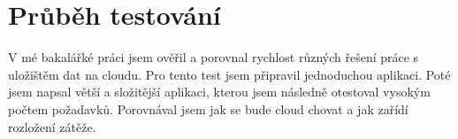 \section{Průběh testování}
V mé bakalářké práci jsem ověřil a porovnal rychlost různých řešení práce s uložištěm dat na cloudu. Pro tento test jsem připravil jednoduchou aplikaci. Poté jsem napsal větší a složitější aplikaci, kterou jsem následně otestoval vysokým počtem požadavků. Porovnával jsem jak se bude cloud chovat a jak zařídí rozložení zátěže.